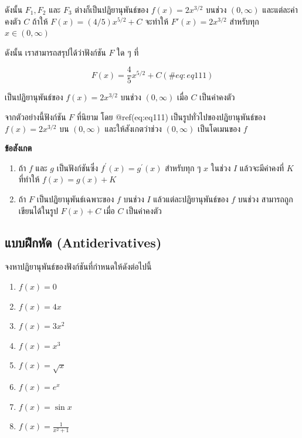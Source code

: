 \documentclass[
]{book}
\begin{document}
ดังนั้น \(F_1,F_2\) และ \(F_3\) ต่างก็เป็นปฏิยานุพันธ์ของ \(f(x) = 2x^{3/2}\)
บนช่วง \(\left( {0 ,\infty } \right)\) และแต่ละค่าคงตัว \(C\) ถ้าให้
\(F(x) =(4/5)x^{5/2} + C\) จะทำให้ \(F'(x) = 2x^{3/2}\) สำหรับทุก
\(x \in \left( 0 ,\infty  \right)\)

ดังนั้น เราสามารถสรุปได้ว่าฟังก์ชัน \(F\) ใด ๆ ที่

\begin{equation}
    F(x) = \frac{4}{5} x^{5/2} + C
    (\#eq:eq111)
\end{equation}

เป็นปฏิยานุพันธ์ของ \(f(x) = 2x^{3/2}\) บนช่วง \(\left( 0 ,\infty  \right)\)
เมื่อ \(C\) เป็นค่าคงตัว

จากตัวอย่างนี้ฟังก์ชัน \(F\) ที่นิยาม โดย @ref(eq:eq111) เป็นรูปทั่วไปของปฏิยานุพันธ์ของ
\(f(x) = 2x^{3/2}\) บน \(\left( 0 ,\infty  \right)\) และให้สังเกตว่าช่วง
\(\left( 0
,\infty  \right)\) เป็นโดเมนของ \(f\)

\textbf{ข้อสังเกต}

\begin{enumerate}
\def\labelenumi{\arabic{enumi}.}
\item
  ถ้า \(f\) และ \(g\) เป็นฟังก์ชันซึ่ง \(f^{'}(x) = g^{'}(x)\) สำหรับทุก ๆ \(x\)
  ในช่วง \(I\) แล้วจะมีค่าคงที่ \(K\) ที่ทำให้ \(f(x) = g(x) + K\)
\item
  ถ้า \(F\) เป็นปฏิยานุพันธ์เฉพาะของ \(f\) บนช่วง \(I\) แล้วแต่ละปฏิยานุพันธ์ของ
  \(f\) บนช่วง สามารถถูกเขียนได้ในรูป \(F(x) + C\) เมื่อ \(C\) เป็นค่าคงตัว
\end{enumerate}

\subsection{แบบฝึกหัด (Antiderivatives)}\label{prob-anti}

จงหาปฏิยานุพันธ์ของฟังก์ชันที่กำหนดให้ดังต่อไปนี้

\begin{enumerate}
\def\labelenumi{\arabic{enumi}.}
\item
  \(f(x) = 0\)
\item
  \(f(x) = 4x\)
\item
  \(f(x) = 3x^{2 }\)
\item
  \(f(x) = x^{3}\)
\item
  \(f(x) = \sqrt{x}\)
\item
  \(f(x) = e^{x}\)
\item
  \(f(x) = \sin x\)
\item
  \(f(x) = \frac{1}{x^{2}+1}\)
\end{enumerate}
\end{document}
